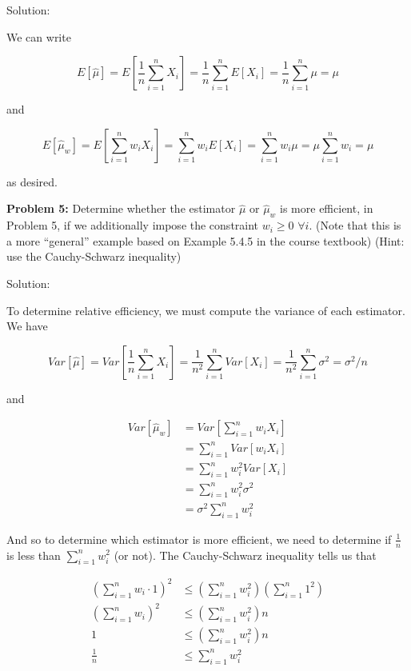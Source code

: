 \documentclass[
  letterpaper,
  DIV=11,
  numbers=noendperiod]{scrreprt}
\begin{document}
Solution:

We can write

\[
E[\hat{\mu}] = E\left[ \frac{1}{n} \sum_{i = 1}^n X_i \right] = \frac{1}{n}\sum_{i = 1}^n E[X_i] = \frac{1}{n}\sum_{i = 1}^n \mu = \mu
\]

and

\[
E[\hat{\mu}_w] = E \left[ \sum_{i = 1}^n w_i X_i \right] = \sum_{i = 1}^n w_i E \left[ X_i \right] = \sum_{i = 1}^n w_i \mu = \mu \sum_{i = 1}^n w_i = \mu
\]

as desired.

\textbf{Problem 5:} Determine whether the estimator \(\hat{\mu}\) or
\(\hat{\mu}_w\) is more efficient, in Problem 5, if we additionally
impose the constraint \(w_i \geq 0\) \(\forall i\). (Note that this is a
more ``general'' example based on Example 5.4.5 in the course textbook)
(Hint: use the Cauchy-Schwarz inequality)

Solution:

To determine relative efficiency, we must compute the variance of each
estimator. We have

\[
Var[\hat{\mu}] = Var \left[ \frac{1}{n} \sum_{i = 1}^n X_i \right] = \frac{1}{n^2} \sum_{i = 1}^n Var[X_i] = \frac{1}{n^2} \sum_{i = 1}^n \sigma^2 = \sigma^2 / n
\]

and

\begin{align*}
    Var[\hat{\mu}_w] & =  Var \left[ \sum_{i = 1}^n w_i X_i \right] \\
    & = \sum_{i = 1}^n Var[w_i X_i] \\
    & = \sum_{i = 1}^n w_i^2 Var[X_i] \\
    & = \sum_{i = 1}^n w_i^2  \sigma^2 \\
    & = \sigma^2 \sum_{i = 1}^n w_i^2
\end{align*}

And so to determine which estimator is more efficient, we need to
determine if \(\frac{1}{n}\) is less than \(\sum_{i = 1}^n w_i^2\) (or
not). The Cauchy-Schwarz inequality tells us that

\begin{align*}
    \left( \sum_{i = 1}^n w_i \cdot 1\right)^2 & \leq \left( \sum_{i = 1}^n w_i^2 \right) \left( \sum_{i = 1}^n 1^2 \right) \\
    \left( \sum_{i = 1}^n w_i \right)^2 & \leq \left( \sum_{i = 1}^n w_i^2 \right) n \\
    1 & \leq \left( \sum_{i = 1}^n w_i^2 \right) n  \\
    \frac{1}{n} & \leq \sum_{i = 1}^n w_i^2
\end{align*}
\end{document}
